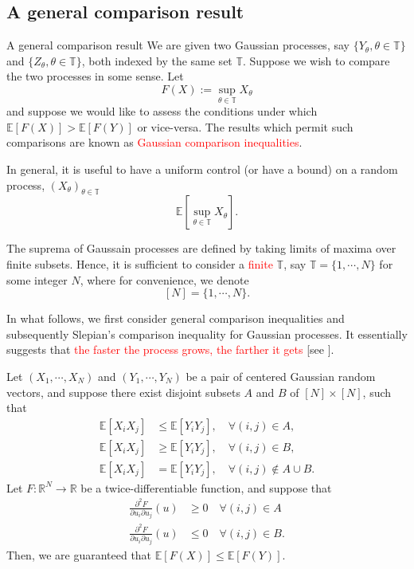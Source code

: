 \documentclass[10pt,handout,english]{beamer}
\newcommand{\E}{\mathbb{E}}
\newcommand{\R}{\mathbb{R}}
\newcommand{\T}{\mathbb{T}}
\begin{document}
\subsection{A general comparison result}
\begin{frame}[allowframebreaks]{A general comparison result}
We are given two Gaussian processes, say $\{Y_{\theta},\theta\in\T\}$ and $\{Z_{\theta},\theta\in\T\}$, both indexed by the same set $\T$. Suppose we wish to compare the two processes in some sense. Let 
\[
F(X):=\sup_{\theta\in\T}X_{\theta}
\]
and suppose we would like to assess the conditions under which $\E[F(X)]>\E[F(Y)]$ or vice-versa. The results which permit such comparisons are known as \textcolor{red}{Gaussian comparison inequalities}. 

In general, it is useful to have a uniform control (or have a bound) on a random process, $(X_{\theta})_{\theta\in\T}$
\[
\E[\sup_{\theta\in\T}X_{\theta}].
\]

The suprema of Gaussain processes are defined by taking limits of maxima over finite subsets. Hence, it is sufficient to consider a \textcolor{red}{finite} $\T$, say $\T=\{1,\cdots,N\}$ for some integer $N$, where for convenience, we denote 
\[
[N]=\{1,\cdots,N\}.
\]

In what follows, we first consider general comparison inequalities and subsequently Slepian's comparison inequality for Gaussian processes. It essentially suggests that \textcolor{red}{the faster the process grows, the farther it gets} [see \citet{vershynin2018high}].
\end{frame}
\begin{frame}
\begin{theorem}
Let $(X_1,\cdots,X_N)$ and $(Y_1,\cdots,Y_N)$ be a pair of centered Gaussian random vectors, and suppose there exist disjoint subsets $A$ and $B$ of $[N]\times[N]$, such that\justifying
\begin{align*}
\E[X_iX_j]&\leq \E[Y_iY_j],\quad\forall (i,j)\in A,\\
\E[X_iX_j]&\geq \E[Y_iY_j],\quad\forall (i,j)\in B,\\
\E[X_iX_j]&= \E[Y_iY_j],\quad\forall (i,j)\notin A\cup B. 
\end{align*}
Let $F:\R^{N}\to\R$ be a twice-differentiable function, and suppose that
\begin{align*}
\frac{\partial^2F}{\partial u_i\partial u_j}(u)&\geq 0\quad \forall (i,j)\in A\\
\frac{\partial^2F}{\partial u_i\partial u_j}(u)&\leq 0\quad \forall (i,j)\in B.
\end{align*}
Then, we are guaranteed that $\E[F(X)]\leq\E[F(Y)]$.
\end{theorem}
\end{frame}
\end{document}
